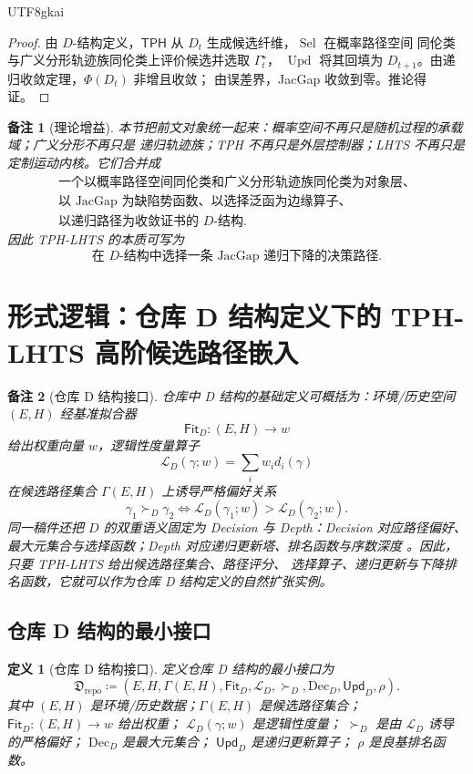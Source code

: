 \documentclass[12pt]{article}
\newtheorem{definition}{定义}[section]
\newtheorem{remark}{备注}[section]
\newcommand{\TPH}{\ensuremath{\mathsf{TPH}}}
\newcommand{\DefEq}{\coloneqq}
\DeclareMathOperator{\Sel}{Sel}
\DeclareMathOperator{\Upd}{Upd}
\begin{document}
\begin{CJK*}{UTF8}{gkai}
\begin{proof}
由 \(D\)-结构定义，\(\TPH\) 从 \(D_t\) 生成候选纤维，\(\Sel\) 在概率路径空间
同伦类与广义分形轨迹族同伦类上评价候选并选取 \(\Gamma_t^\star\)，
\(\Upd\) 将其回填为 \(D_{t+1}\)。由递归收敛定理，\(\Phi(D_t)\) 非增且收敛；
由误差界，JacGap 收敛到零。推论得证。
\end{proof}

\begin{remark}[理论增益]
本节把前文对象统一起来：概率空间不再只是随机过程的承载域；广义分形不再只是
递归轨迹族；TPH 不再只是外层控制器；LHTS 不再只是定制运动内核。它们合并成
\[
\boxed{
\begin{gathered}
\text{一个以概率路径空间同伦类和广义分形轨迹族同伦类为对象层、}
\\
\text{以 JacGap 为缺陷势函数、以选择泛函为边缘算子、}
\\
\text{以递归路径为收敛证书的 }D\text{-结构}.
\end{gathered}
}
\]
因此 TPH-LHTS 的本质可写为
\[
\boxed{
\text{在 }D\text{-结构中选择一条 JacGap 递归下降的决策路径}.
}
\]
\end{remark}

\section{形式逻辑：仓库 D 结构定义下的 TPH-LHTS 高阶候选路径嵌入}
\label{sec:repo-d-structure-tph-lhts-embedding}

\begin{remark}[仓库 D 结构接口]
仓库中 D 结构的基础定义可概括为：环境/历史空间 \((E,H)\) 经基准拟合器
\[
\mathsf{Fit}_D:(E,H)\to w
\]
给出权重向量 \(w\)，逻辑性度量算子
\[
\mathcal L_D(\gamma;w)=\sum_i w_i d_i(\gamma)
\]
在候选路径集合 \(\Gamma(E,H)\) 上诱导严格偏好关系
\[
\gamma_1\succ_D\gamma_2
\Longleftrightarrow
\mathcal L_D(\gamma_1;w)>\mathcal L_D(\gamma_2;w).
\]
同一稿件还把 \(D\) 的双重语义固定为 Decision 与 Depth：Decision 对应路径偏好、
最大元集合与选择函数；Depth 对应递归更新塔、排名函数与序数深度
\cite{RepoTex3DStructure}。因此，只要 TPH-LHTS 给出候选路径集合、路径评分、
选择算子、递归更新与下降排名函数，它就可以作为仓库 D 结构定义的自然扩张实例。
\end{remark}

\subsection{仓库 D 结构的最小接口}
\label{subsec:repo-d-minimal-interface}

\begin{definition}[仓库 D 结构接口]
定义仓库 D 结构的最小接口为
\[
\mathfrak D_{\mathrm{repo}}
\DefEq
(E,H,\Gamma(E,H),\mathsf{Fit}_D,\mathcal L_D,\succ_D,\mathrm{Dec}_D,\mathsf{Upd}_D,\rho).
\]
其中 \((E,H)\) 是环境/历史数据；\(\Gamma(E,H)\) 是候选路径集合；
\(\mathsf{Fit}_D:(E,H)\to w\) 给出权重；
\(\mathcal L_D(\gamma;w)\) 是逻辑性度量；
\(\succ_D\) 是由 \(\mathcal L_D\) 诱导的严格偏好；
\(\mathrm{Dec}_D\) 是最大元集合；
\(\mathsf{Upd}_D\) 是递归更新算子；
\(\rho\) 是良基排名函数。
\end{definition}


\end{CJK*}
\end{document}
